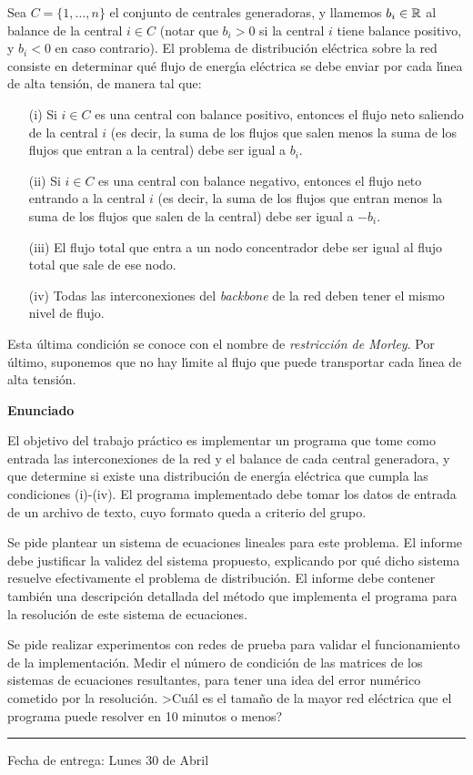 Sea $C=\{1,\dots,n\}$ el conjunto de centrales generadoras, y llamemos
$b_i\in\mathbb R$ al balance de la central $i\in C$ (notar que $b_i>0$ si la
central $i$ tiene balance positivo, y $b_i<0$ en caso contrario). El problema
de distribuci\'on el\'ectrica sobre la red consiste en determinar
qu\'e flujo de energ\'\i a el\'ectrica se debe enviar por cada l\'\i nea
de alta tensi\'on, de manera tal que:
\begin{itemize}
\item[(i)] Si $i\in C$ es una central con balance positivo, entonces el flujo
neto saliendo de la central $i$ (es decir, la suma de los flujos que salen
menos la suma de los flujos que entran a la central) debe ser igual a $b_i$.
\item[(ii)] Si $i\in C$ es una central con balance negativo, entonces el
flujo neto entrando a la central $i$ (es decir, la suma de los flujos que
entran menos la suma de los flujos que salen de la central) debe ser igual
a $-b_i$.
\item[(iii)] El flujo total que entra a un nodo concentrador debe ser igual
al flujo total que sale de ese nodo.
\item[(iv)] Todas las interconexiones del \emph{backbone} de la red deben
tener el mismo nivel de flujo.
\end{itemize}
Esta \'ultima condici\'on se conoce con el nombre de \emph{restricci\'on
de Morley}. Por \'ultimo, su\-po\-ne\-mos que no hay l\'\i mite al flujo que
puede transportar cada l\'\i nea de alta tensi\'on.

\textbf{Enunciado}

El objetivo del trabajo pr\'actico es implementar un programa que tome como
entrada las interconexiones de la red y el balance de cada central
generadora, y que determine si existe una distribuci\'on de energ\'\i a
el\'ectrica que cumpla las condiciones (i)-(iv). El programa implementado
debe tomar los datos de entrada de un archivo de texto, cuyo formato queda
a criterio del grupo.

Se pide plantear un sistema de ecuaciones lineales para este problema.
El informe debe justificar la validez del sistema propuesto, explicando por
qu\'e dicho sistema resuelve efectivamente el problema de distribuci\'on.
El informe debe contener tambi\'en una descripci\'on detallada del m\'etodo
que implementa el programa para la resoluci\'on de este sistema de ecuaciones.

Se pide realizar experimentos con redes de prueba para validar el
funcionamiento de la implementaci\'on. Medir el n\'umero de condici\'on de
las matrices de los sistemas de ecuaciones resultantes, para tener una idea
del error num\'erico cometido por la resoluci\'on. >Cu\'al es el tama\~no
de la mayor red el\'ectrica que el programa puede resolver en 10 minutos
o menos?

\vskip 15pt

\hrule

\vskip 11pt

Fecha de entrega: Lunes 30 de Abril
